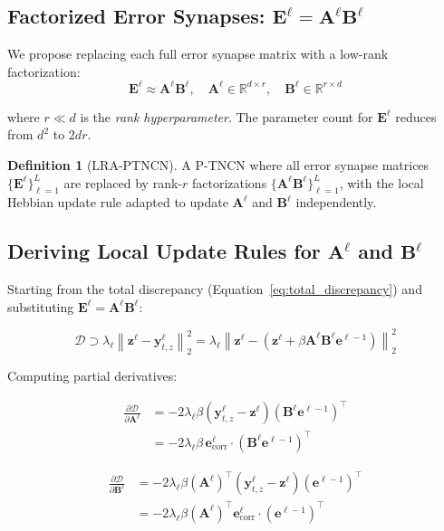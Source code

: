 \documentclass[11pt]{article}
\theoremstyle{definition}
\newtheorem{definition}{Definition}[section]
\newcommand{\vz}{\mathbf{z}}
\newcommand{\vy}{\mathbf{y}}
\newcommand{\ve}{\mathbf{e}}
\newcommand{\E}{\mathbf{E}}
\newcommand{\A}{\mathbf{A}}
\newcommand{\B}{\mathbf{B}}
\newcommand{\Rbb}{\mathbb{R}}
\newcommand{\norm}[1]{\left\|#1\right\|}
\newcommand{\pderiv}[2]{\frac{\partial #1}{\partial #2}}
\begin{document}
\subsection{Factorized Error Synapses: $\E^\ell = \A^\ell \B^\ell$}

We propose replacing each full error synapse matrix with a low-rank factorization:
\begin{equation}
  \label{eq:lora_E}
  \E^\ell \approx \A^\ell \B^\ell, \quad \A^\ell \in \Rbb^{d \times r}, \quad \B^\ell \in \Rbb^{r \times d}
\end{equation}

where $r \ll d$ is the \emph{rank hyperparameter}. The parameter count for $\E^\ell$ reduces from $d^2$ to $2dr$.

\begin{definition}[LRA-PTNCN]
A P-TNCN where all error synapse matrices $\{\E^\ell\}_{\ell=1}^L$ are replaced
by rank-$r$ factorizations $\{\A^\ell \B^\ell\}_{\ell=1}^L$, with the local
Hebbian update rule adapted to update $\A^\ell$ and $\B^\ell$ independently.
\end{definition}

\subsection{Deriving Local Update Rules for $\A^\ell$ and $\B^\ell$}

Starting from the total discrepancy (Equation~\eqref{eq:total_discrepancy})
and substituting $\E^\ell = \A^\ell \B^\ell$:

\begin{equation}
  \mathcal{D} \supset \lambda_\ell \norm{\vz^\ell - \vy^\ell_{t,z}}^2_2
  = \lambda_\ell \norm{\vz^\ell - (\vz^\ell + \beta \A^\ell \B^\ell \ve^{\ell-1})}^2_2
\end{equation}

Computing partial derivatives:

\begin{align}
  \pderiv{\mathcal{D}}{\A^\ell}
    &= -2\lambda_\ell \beta \left(\vy^\ell_{t,z} - \vz^\ell\right) \left(\B^\ell \ve^{\ell-1}\right)^\top \\
    &= -2\lambda_\ell \beta \, \ve^\ell_\text{corr} \cdot \left(\B^\ell \ve^{\ell-1}\right)^\top
    \label{eq:dA}
\end{align}

\begin{align}
  \pderiv{\mathcal{D}}{\B^\ell}
    &= -2\lambda_\ell \beta \left(\A^\ell\right)^\top \left(\vy^\ell_{t,z} - \vz^\ell\right) \left(\ve^{\ell-1}\right)^\top \\
    &= -2\lambda_\ell \beta \left(\A^\ell\right)^\top \ve^\ell_\text{corr} \cdot \left(\ve^{\ell-1}\right)^\top
    \label{eq:dB}
\end{align}
\end{document}
